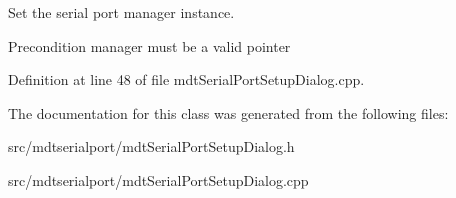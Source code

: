 Set the serial port manager instance. 

\begin{DoxyPrecond}{Precondition}
manager must be a valid pointer 
\end{DoxyPrecond}


Definition at line 48 of file mdtSerialPortSetupDialog.cpp.



The documentation for this class was generated from the following files:\begin{DoxyCompactItemize}
\item 
src/mdtserialport/mdtSerialPortSetupDialog.h\item 
src/mdtserialport/mdtSerialPortSetupDialog.cpp\end{DoxyCompactItemize}
